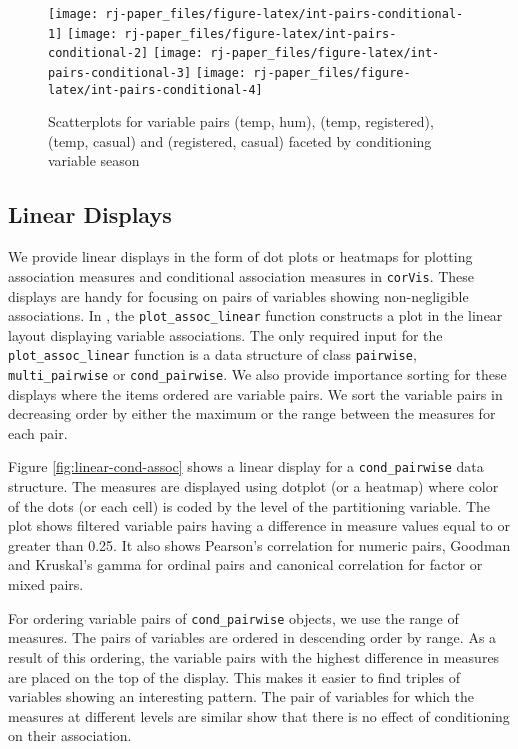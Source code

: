 \begin{figure}
\texttt{[image: rj-paper\_files/figure-latex/int-pairs-conditional-1]} \texttt{[image: rj-paper\_files/figure-latex/int-pairs-conditional-2]} \texttt{[image: rj-paper\_files/figure-latex/int-pairs-conditional-3]} \texttt{[image: rj-paper\_files/figure-latex/int-pairs-conditional-4]} \caption{Scatterplots for variable pairs (temp, hum), (temp, registered), (temp, casual) and (registered, casual) faceted by conditioning variable season}\label{fig:int-pairs-conditional}
\end{figure}

\hypertarget{linear-displays}{%
\subsection{Linear Displays}\label{linear-displays}}

We provide linear displays in the form of dot plots or heatmaps for plotting association measures and conditional association measures in \texttt{corVis}. These displays are handy for focusing on pairs of variables showing non-negligible associations. In , the \texttt{plot\_assoc\_linear} function constructs a plot in the linear layout displaying variable associations. The only required input for the \texttt{plot\_assoc\_linear} function is a data structure of class \texttt{pairwise}, \texttt{multi\_pairwise} or \texttt{cond\_pairwise}. We also provide importance sorting for these displays where the items ordered are variable pairs. We sort the variable pairs in decreasing order by either the maximum or the range between the measures for each pair.

Figure \ref{fig:linear-cond-assoc} shows a linear display for a \texttt{cond\_pairwise} data structure. The measures are displayed using dotplot (or a heatmap) where color of the dots (or each cell) is coded by the level of the partitioning variable. The plot shows filtered variable pairs having a difference in measure values equal to or greater than 0.25. It also shows Pearson's correlation for numeric pairs, Goodman and Kruskal's gamma for ordinal pairs and canonical correlation for factor or mixed pairs.

For ordering variable pairs of \texttt{cond\_pairwise} objects, we use the range of measures. The pairs of variables are ordered in descending order by range. As a result of this ordering, the variable pairs with the highest difference in measures are placed on the top of the display. This makes it easier to find triples of variables showing an interesting pattern. The pair of variables for which the measures at different levels are similar show that there is no effect of conditioning on their association.

